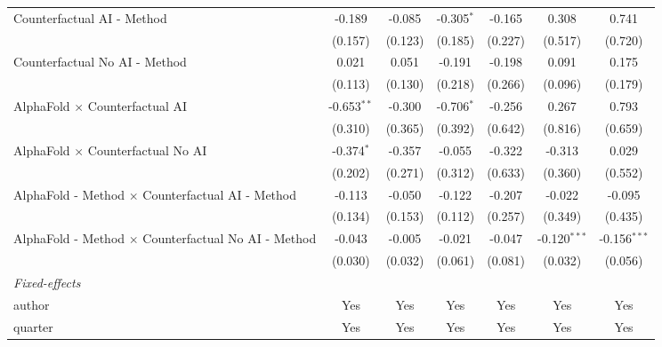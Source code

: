 \begin{tabular}{lcccccc}
   Counterfactual AI - Method                                 & -0.189        & -0.085        & -0.305$^{*}$ & -0.165  & 0.308          & 0.741\\   
                                                              & (0.157)       & (0.123)       & (0.185)      & (0.227) & (0.517)        & (0.720)\\   
   Counterfactual No AI - Method                              & 0.021         & 0.051         & -0.191       & -0.198  & 0.091          & 0.175\\   
                                                              & (0.113)       & (0.130)       & (0.218)      & (0.266) & (0.096)        & (0.179)\\   
   AlphaFold $\times$ Counterfactual AI                       & -0.653$^{**}$ & -0.300        & -0.706$^{*}$ & -0.256  & 0.267          & 0.793\\   
                                                              & (0.310)       & (0.365)       & (0.392)      & (0.642) & (0.816)        & (0.659)\\   
   AlphaFold $\times$ Counterfactual No AI                    & -0.374$^{*}$  & -0.357        & -0.055       & -0.322  & -0.313         & 0.029\\   
                                                              & (0.202)       & (0.271)       & (0.312)      & (0.633) & (0.360)        & (0.552)\\   
   AlphaFold - Method $\times$ Counterfactual AI - Method     & -0.113        & -0.050        & -0.122       & -0.207  & -0.022         & -0.095\\   
                                                              & (0.134)       & (0.153)       & (0.112)      & (0.257) & (0.349)        & (0.435)\\   
   AlphaFold - Method $\times$ Counterfactual No AI - Method  & -0.043        & -0.005        & -0.021       & -0.047  & -0.120$^{***}$ & -0.156$^{***}$\\   
                                                              & (0.030)       & (0.032)       & (0.061)      & (0.081) & (0.032)        & (0.056)\\   
   \midrule
   \emph{Fixed-effects}\\
   author                                                     & Yes           & Yes           & Yes          & Yes     & Yes            & Yes\\  
   quarter                                                    & Yes           & Yes           & Yes          & Yes     & Yes            & Yes\\  

\end{tabular}
